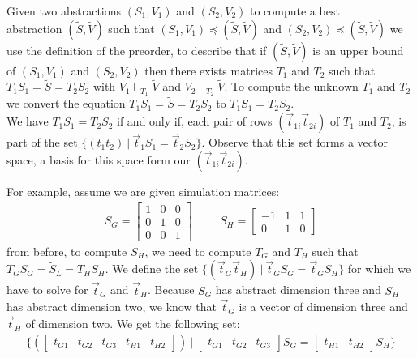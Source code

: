 Given two \qvasr abstractions $(S_1, V_1)$ and $(S_2, V_2)$ to compute a best \\ \qvasr abstraction $(\tilde{S}, \tilde{V})$ such that $(S_1, V_1) \preceq (\tilde{S}, \tilde{V})$ and $(S_2, V_2) \preceq (\tilde{S}, \tilde{V})$ we use the definition of the preorder, to describe that if $(\tilde{S}, \tilde{V})$ is an upper bound of $(S_1, V_1)$ and $(S_2, V_2)$ then there exists matrices $T_1$ and $T_2$ such that $T_1S_1 = \tilde{S} = T_2S_2$ with $V_1 \vdash_{T_1} \tilde{V}$ and $V_2 \vdash_{T_2} \tilde{V}$. To compute the unknown $T_1$ and $T_2$ we convert the equation $T_1S_1 = \tilde{S} = T_2S_2$ to $T_1S_1 = T_2S_2$. \\
We have $T_1S_1 = T_2S_2$ if and only if, each pair of rows $(\vec{t}_{1i}\vec{t}_{2i})$ of $T_1$ and $T_2$, is part of the set $\{ (t_1t_2)\ |\  \vec{t}_1S_1 = \vec{t}_2S_2\}$. Observe that this set forms a vector space, a basis for this space form our $(\vec{t}_{1i}\vec{t}_{2i})$. \par
For example, assume we are given simulation matrices: 
\begin{align*}
	S_G = \begin{bmatrix} 1 & 0 & 0 \\ 0 & 1 & 0 \\0 & 0 & 1 \end{bmatrix} \hspace{1cm}
	S_H = \begin{bmatrix} -1 & 1 & 1 \\ 0 & 1 & 0 \end{bmatrix}
\end{align*}
 from before, to compute $\tilde{S}_H$, we need to compute $T_G$ and $T_H$ such that $T_GS_G = \tilde{S}_L = T_HS_H$. We define the set $\{ (\vec{t}_G\vec{t}_H)\ |\  \vec{t}_GS_G = \vec{t}_GS_H\}$ for which we have to solve for $\vec{t}_G$ and $\vec{t}_H$. Because $S_G$ has abstract dimension three and $S_H$ has abstract dimension two, we know that $\vec{t}_G$ is a vector of dimension three and $\vec{t}_H$ of dimension two. We get the following set:
\begin{align*}
	\{ (\begin{bmatrix} t_{G1} & t_{G2} & t_{G3} & t_{H1} & t_{H2} \end{bmatrix})\ |\  \begin{bmatrix} t_{G1} & t_{G2} & t_{G3}\end{bmatrix}S_G = \begin{bmatrix} t_{H1} & t_{H2} \end{bmatrix}S_H\}
\end{align*}
